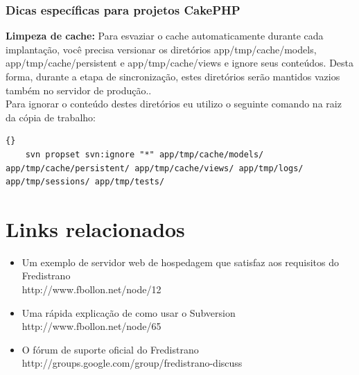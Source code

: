 \documentclass[12pt,a4paper]{report}
\begin{document}
\subsection{Dicas específicas para projetos CakePHP} %
\begin{list}{-}{}
	\item \textbf{Limpeza de cache:} Para esvaziar o cache automaticamente durante cada implantação, você precisa versionar os diretórios app/tmp/cache/models, app/tmp/cache/persistent e app/tmp/cache/views e ignore seus conteúdos.  Desta forma, durante a etapa de sincronização, estes diretórios serão mantidos vazios também no servidor de produção..\\
	Para ignorar o conteúdo destes diretórios eu utilizo o seguinte comando na raiz da cópia de trabalho:
	\lstset{language=bash}
	\lstset{breaklines=true}
	\lstset{tabsize=1}
	\begin{lstlisting}[frame=tb]{}
	svn propset svn:ignore "*" app/tmp/cache/models/ app/tmp/cache/persistent/ app/tmp/cache/views/ app/tmp/logs/ app/tmp/sessions/ app/tmp/tests/
	\end{lstlisting}
\end{list}




\chapter{Links relacionados}
\begin{itemize}
\item Um exemplo de servidor web de hospedagem que satisfaz aos requisitos do Fredistrano \\ http://www.fbollon.net/node/12 \\
\item Uma rápida explicação de como usar o Subversion \\ http://www.fbollon.net/node/65 \\
\item O fórum de suporte oficial do Fredistrano \\ http://groups.google.com/group/fredistrano-discuss
\end{itemize}
\end{document}
